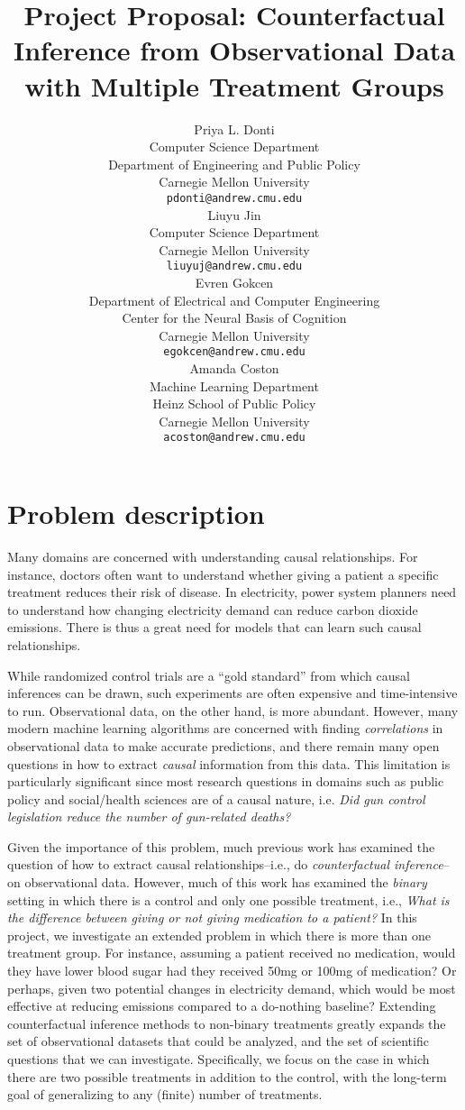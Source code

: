 \documentclass{article}
\title{Project Proposal: Counterfactual Inference from Observational Data with Multiple Treatment Groups}
\author{
  Priya L. Donti \\
  Computer Science Department \\
  Department of Engineering and Public Policy \\
  Carnegie Mellon University \\
  \texttt{pdonti@andrew.cmu.edu} \\
  \And
  Liuyu Jin\\
  Computer Science Department \\
  Carnegie Mellon University \\
  \texttt{liuyuj@andrew.cmu.edu} \\
  \AND
  Evren Gokcen\\
  Department of Electrical and Computer Engineering \\
  Center for the Neural Basis of Cognition\\
  Carnegie Mellon University \\
  \texttt{egokcen@andrew.cmu.edu} \\
  \And
  Amanda Coston \\
  Machine Learning Department \\
  Heinz School of Public Policy \\
  Carnegie Mellon University \\
  \texttt{acoston@andrew.cmu.edu} \\
}
\begin{document}

\maketitle

\section{Problem description}
Many domains are concerned with understanding causal relationships.
For instance, doctors often want to understand whether giving a patient a specific treatment reduces their risk of disease.
In electricity, power system planners need to understand how changing electricity demand can reduce carbon dioxide emissions.
There is thus a great need for models that can learn such causal relationships.

While randomized control trials are a ``gold standard'' from which causal inferences can be drawn, such experiments are often expensive and time-intensive to run.
Observational data, on the other hand, is more abundant.
However, many modern machine learning algorithms are concerned with finding \emph{correlations} in observational data to make accurate predictions, and there remain many open questions in how to extract \emph{causal} information from this data. This limitation is particularly significant since most research questions in domains such as public policy and social/health sciences are of a causal nature, i.e. \emph{Did gun control legislation reduce the number of gun-related deaths?}

Given the importance of this problem, much previous work has examined the question of how to extract causal relationships--i.e., do \emph{counterfactual inference}--on observational data.
However, much of this work has examined the \emph{binary} setting in which there is a control and only one possible treatment, i.e., \emph{What is the difference between giving or not giving medication to a patient?}
In this project, we investigate an extended problem in which there is more than one treatment group.
For instance, assuming a patient received no medication, would they have lower blood sugar had they received 50mg or 100mg of medication?
Or perhaps, given two potential changes in electricity demand, which would be most effective at reducing emissions compared to a do-nothing baseline?
Extending counterfactual inference methods to non-binary treatments greatly expands the set of observational datasets that could be analyzed, and the set of scientific questions that we can investigate.
Specifically, we focus on the case in which there are two possible treatments in addition to the control, with the long-term goal of generalizing to any (finite) number of treatments.
\end{document}
